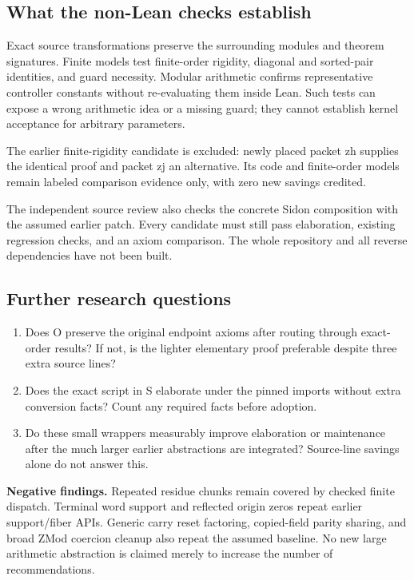 \subsection{What the non-Lean checks establish}
Exact source transformations preserve the surrounding modules and theorem signatures. Finite models test finite-order rigidity, diagonal and sorted-pair identities, and guard necessity. Modular arithmetic confirms representative controller constants without re-evaluating them inside Lean. Such tests can expose a wrong arithmetic idea or a missing guard; they cannot establish kernel acceptance for arbitrary parameters.

The earlier finite-rigidity candidate is excluded: newly placed packet zh supplies the identical proof and packet zj an alternative. Its code and finite-order models remain labeled comparison evidence only, with zero new savings credited.

The independent source review also checks the concrete Sidon composition with the assumed earlier patch. Every candidate must still pass elaboration, existing regression checks, and an axiom comparison. The whole repository and all reverse dependencies have not been built.

\subsection{Further research questions}
\begin{enumerate}
\item Does O preserve the original endpoint axioms after routing through exact-order results? If not, is the lighter elementary proof preferable despite three extra source lines?
\item Does the exact  script in S elaborate under the pinned imports without extra conversion facts? Count any required facts before adoption.
\item Do these small wrappers measurably improve elaboration or maintenance after the much larger earlier abstractions are integrated? Source-line savings alone do not answer this.
\end{enumerate}

\textbf{Negative findings.} Repeated residue chunks remain covered by checked finite dispatch. Terminal word support and reflected origin zeros repeat earlier support/fiber APIs. Generic carry reset factoring, copied-field parity sharing, and broad ZMod coercion cleanup also repeat the assumed baseline. No new large arithmetic abstraction is claimed merely to increase the number of recommendations.


